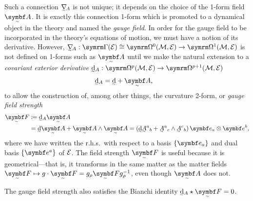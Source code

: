 Such a connection $\ts\nabla_{\!A}$ is not unique; it depends on the choice of the 1-form field $\tsbm A$.
It is exactly this connection 1-form which is promoted to a dynamical object in the theory and named the \emph{gauge field}.
In order for the gauge field to be incorporated in the theory's equations of motion, we must have a notion of its derivative.
However, $\ts\nabla_{\!A} : \secs(\cal E) \cong \forms^0(\cal M, \cal E) \to \forms^1(\cal M, \cal E)$ is not defined on 1-forms such as $\tsbm A$ until we make the natural extension\footnotemark{} to a \emph{covariant exterior derivative}
$\ts\dd_A : \forms^p(\cal M, \cal E) \to \forms^{p + 1}(\cal M, \cal E)$
\begin{align}
	\ts\dd_A &= \ts\dd + \tsbm A
,\end{align}
%
to allow the construction of, among other things, the curvature 2-form, or \emph{gauge field strength}
\begin{align}
	\tsbm F &\coloneq \ts\dd_A\tsbm A
\\	&= \ts\dd\tsbm A + \tsbm A \wedge \tsbm A
	= (\ts\dd\ts A^a{}_b + \ts A^a{}_c \wedge \ts A^c{}_b) \, \bm e_a \otimes \bm e^b
,\end{align}
where we have written the r.h.s.\ with respect to a basis $\qty{\bm e_a}$ and dual basis $\qty{\bm e^a}$ of $\cal E$.
The field strength $\tsbm F$ is useful because it is geometrical---that is, it transforms in the same matter as the matter fields $\tsbm F \mapsto g\cdot\tsbm F = g_\rho\tsbm F g_\rho^{-1}$, even though $\tsbm A$ does not.

The gauge field strength also satisfies the Bianchi identity $\ts\dd_A\star\tsbm F = 0$.

